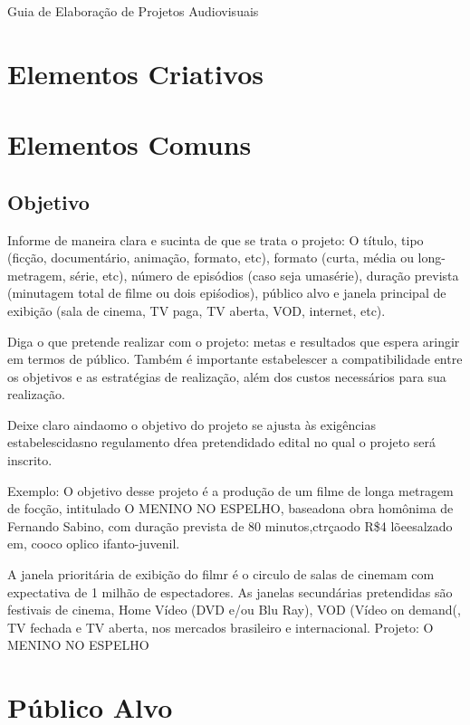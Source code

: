 Guia de Elaboração de Projetos Audiovisuais

\chapter{Elementos Criativos}

\chapter{Elementos Comuns}

\section{Objetivo}

Informe de maneira clara e sucinta de que se trata o projeto: O título, tipo (ficção, documentário, animação, formato, etc), formato (curta, média ou long-metragem, série, etc), número de episódios (caso seja umasérie), duração prevista (minutagem total de filme ou dois epiśodios), público alvo e janela principal de exibição (sala de cinema, TV paga, TV aberta, VOD, internet, etc).

Diga o que pretende realizar com o projeto: metas e resultados que espera aringir em termos de público. Também é importante estabelescer a compatibilidade entre os objetivos e as estratégias de realização, além dos custos necessários para sua realização.

Deixe claro aindaomo o objetivo do projeto se ajusta às exigências estabelescidasno regulamento dŕea pretendidado edital no qual o projeto será inscrito.

Exemplo:
O objetivo desse projeto é a produção de um filme de longa metragem de focção, intitulado O MENINO NO ESPELHO, baseadona obra homônima de Fernando Sabino, com duração prevista de 80 minutos,ctrçaodo R\$4 lõeesalzado em, cooco oplico ifanto-juvenil.

A janela prioritária de exibição do filmr é o circulo de salas de cinemam com expectativa de 1 milhão de espectadores. As janelas secundárias pretendidas são festivais de cinema, Home Vídeo (DVD e/ou Blu Ray), VOD (Vídeo on demand(, TV fechada e TV aberta, nos mercados brasileiro e internacional.
Projeto: O MENINO NO ESPELHO

\chapter{Público Alvo}

